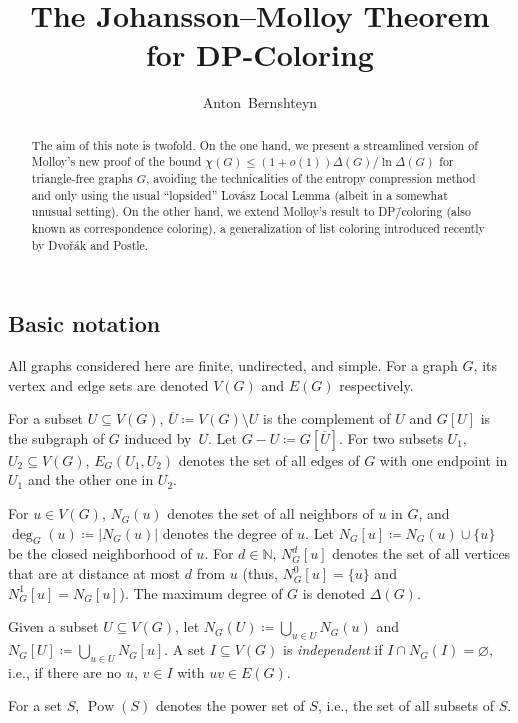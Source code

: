 \documentclass[11pt, reqno, psamsfonts]{amsart}
\title{The Johansson--Molloy Theorem for DP-Coloring}
\date{}
\author{Anton~Bernshteyn}
\theoremstyle{definition}
\theoremstyle{remark}
\newcommand{\0}{\varnothing}
\newcommand{\set}[1]{\{#1\}}
\newcommand{\N}{\mathbb{N}}
\renewcommand{\leq}{\leqslant}
\newcommand{\powerset}[1]{\operatorname{Pow}(#1)}
\newcommand{\defeq}{\coloneqq}
\numberwithin{equation}{section}
\begin{document}
	
	\maketitle
	
	\begin{abstract}
		The aim of this note is twofold. On the one hand, we present a streamlined version of Molloy's new proof of the bound $\chi(G) \leq (1+o(1))\Delta(G)/\ln \Delta(G)$ for triangle-free graphs $G$, avoiding the technicalities of the entropy compression method and only using the usual ``lopsided'' Lov\'asz Local Lemma (albeit in a somewhat unusual setting). On the other hand, we extend Molloy's result to DP\=/coloring (also known as correspondence coloring), a generalization of list coloring introduced recently by Dvo\v{r}\'{a}k and Postle.
	\end{abstract}
	
		\subsection*{Basic notation}
		
		All graphs considered here are finite, undirected, and simple. For a graph $G$, its vertex and edge sets are denoted $V(G)$ and $E(G)$ respectively.
		
		For a subset $U \subseteq V(G)$, $\overline{U} \defeq V(G) \setminus U$ is the complement of $U$ and $G[U]$ is the subgraph of $G$ induced by~$U$. Let $G - U \defeq G[\overline{U}]$. For two subsets $U_1$, $U_2 \subseteq V(G)$, $E_G(U_1, U_2)$ denotes the set of all edges of $G$ with one endpoint in $U_1$ and the other one in $U_2$.
		
		For $u \in V(G)$, $N_G(u)$ denotes the set of all neighbors of $u$ in $G$, and $\deg_G(u) \defeq |N_G(u)|$ denotes the degree of $u$. Let $N_G[u] \defeq N_G(u) \cup \set{u}$ be the closed neighborhood of $u$. For $d \in \N$, $N_G^d[u]$ denotes the set of all vertices that are at distance at most $d$ from $u$ (thus, $N_G^0[u] = \set{u}$ and $N_G^1[u] = N_G[u]$). The maximum degree of $G$ is denoted $\Delta(G)$.
		
		Given a subset $U \subseteq V(G)$, let $N_G(U) \defeq \bigcup_{u \in U} N_G(u)$ and $N_G[U] \defeq \bigcup_{u \in U} N_G[u]$. A set $I \subseteq V(G)$ is \emph{independent} if $I \cap N_G(I) = \0$, i.e., if there are no $u$, $v \in I$ with $uv \in E(G)$.
		
		For a set $S$, $\powerset{S}$ denotes the power set of $S$, i.e., the set of all subsets of $S$.
	
\end{document}
